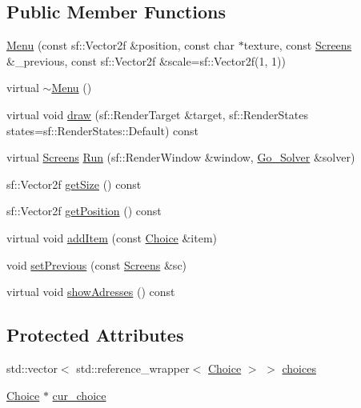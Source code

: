 \subsection*{Public Member Functions}
\begin{DoxyCompactItemize}
\item 
\hyperlink{class_menu_a0e8556179fdcc650e7f3aa58b05f9f4f}{Menu} (const sf\+::\+Vector2f \&position, const char $\ast$texture, const \hyperlink{_globals_8h_a3d5776bab98402b03be09156bacf4f68}{Screens} \&\+\_\+previous, const sf\+::\+Vector2f \&scale=sf\+::\+Vector2f(1, 1))
\item 
virtual \hyperlink{class_menu_a831387f51358cfb88cd018e1777bc980}{$\sim$\+Menu} ()
\item 
virtual void \hyperlink{class_menu_a7bc75c51f0ae43faeb694b8a0c4c7d16}{draw} (sf\+::\+Render\+Target \&target, sf\+::\+Render\+States states=sf\+::\+Render\+States\+::\+Default) const
\item 
virtual \hyperlink{_globals_8h_a3d5776bab98402b03be09156bacf4f68}{Screens} \hyperlink{class_menu_ac72037385d58cb1c814d7702c79e93f5}{Run} (sf\+::\+Render\+Window \&window, \hyperlink{class_go___solver}{Go\+\_\+\+Solver} \&solver)
\item 
sf\+::\+Vector2f \hyperlink{class_menu_ad99768326c994acf4fba6d9df60d1bcc}{get\+Size} () const
\item 
sf\+::\+Vector2f \hyperlink{class_menu_a589f53bbd6436b381b5ec92a609d5d66}{get\+Position} () const
\item 
virtual void \hyperlink{class_menu_aa8032782ee75fba5fa17bf7a20635c68}{add\+Item} (const \hyperlink{class_choice}{Choice} \&item)
\item 
void \hyperlink{class_menu_ab2b8f2fc48dfbf397a81e9a1b638f970}{set\+Previous} (const \hyperlink{_globals_8h_a3d5776bab98402b03be09156bacf4f68}{Screens} \&sc)
\item 
virtual void \hyperlink{class_menu_ac4cf83e0769be3a20583668f210d98ef}{show\+Adresses} () const
\end{DoxyCompactItemize}
\subsection*{Protected Attributes}
\begin{DoxyCompactItemize}
\item 
std\+::vector$<$ std\+::reference\+\_\+wrapper$<$ \hyperlink{class_choice}{Choice} $>$ $>$ \hyperlink{class_menu_aa40e2b74e7bdeee960889e083eca15d2}{choices}
\item 
\hyperlink{class_choice}{Choice} $\ast$ \hyperlink{class_menu_a91fc2547256d492def0845bd1ebcfaf8}{cur\+\_\+choice}
\end{DoxyCompactItemize}


